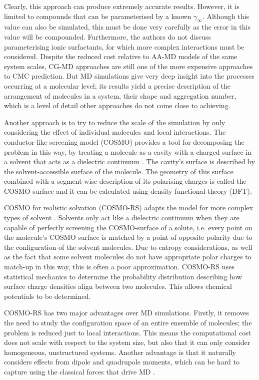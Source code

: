 Clearly, this approach can produce extremely accurate results. However, it is
limited to compounds that can be parameterised by a known $\gamma_\infty$.
Although this value can also be simulated, this must be done very carefully as
the error in this value will be compounded. Furthermore, the authors do not
discuss parameterising ionic surfactants, for which more complex interactions
must be considered. Despite the reduced cost relative to AA-MD models of the
same system scales, CG-MD approaches are still one of the more expensive
approaches to CMC prediction. But MD simulations give very deep insight into the
processes occurring at a molecular level; its results yield a precise
description of the arrangement of molecules in a system, their shape and
aggregation number, which is a level of detail other approaches do not come
close to achieving.

Another approach is to try to reduce the scale of the simulation by only
considering the effect of individual molecules and local interactions. The
conductor-like screening model (COSMO) provides a tool for decomposing the
problem in this way, by treating a molecule as a cavity with a charged surface
in a solvent that acts as a dielectric continuum
\cite{klamtCOSMONewApproach1993}. The cavity's surface is described by the
solvent-accessible surface of the molecule. The geometry of this surface
combined with a segment-wise description of its polarising charges is called the
COSMO-surface and it can be calculated using density functional theory (DFT).

COSMO for realistic solvation (COSMO-RS) adapts the model for more complex types
of solvent \cite{klamtCOSMORSAlternativeSimulation2010}. Solvents only act like
a dielectric continuum when they are capable of perfectly screening the
COSMO-surface of a solute, i.e. every point on the molecule's COSMO surface is
matched by a point of opposite polarity due to the configuration of the solvent
molecules. Due to entropy considerations, as well as the fact that some solvent
molecules do not have appropriate polar charges to match-up in this way, this is
often a poor approximation. COSMO-RS uses statistical mechanics to determine the
probability distribution describing how surface charge densities align between
two molecules. This allows chemical potentials to be determined.

COSMO-RS has two major advantages over MD simulations. Firstly, it removes the
need to study the configuration space of an entire ensemble of molecules; the
problem is reduced just to local interactions. This means the computational cost
does not scale with respect to the system size, but also that it can only
consider homogeneous, unstructured systems. Another advantage is that it
naturally considers effects from dipole and quadrupole moments, which can be
hard to capture using the classical forces that drive MD
\cite{klamtCOSMORSAlternativeSimulation2010}.

